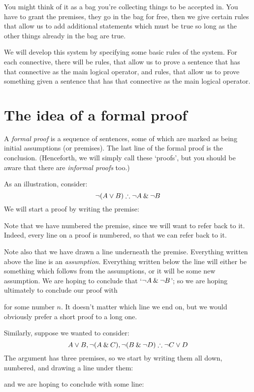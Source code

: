You might think of it as a bag you're collecting things to be accepted in. You have to grant the premises, they go in the bag for free, then we give certain rules that allow us to add additional statements which must be true so long as the other things already in the bag are true. 

We will develop this  system by specifying some basic rules of the system. For each connective, there will be  rules, that allow us to prove a sentence that has that connective as the main logical operator, and  rules, that allow us to prove something given a sentence that has that connective as the main logical operator.



\section{The idea of a formal proof}
A \emph{formal proof} is a sequence of sentences, some of which are marked as being initial assumptions (or premises). The last line of the formal proof is the conclusion. (Henceforth, we will simply call these `proofs', but you should be aware that there are \emph{informal proofs} too.)

As an illustration, consider:
	$$\enot (A \eor B) \therefore \enot A \eand \enot B$$
We will start a proof by writing the premise:
\begin{pf}
\end{pf}
Note that we have numbered the premise, since we will want to refer back to it. Indeed, every line on a proof is numbered, so that we can refer back to it. 

Note also that we have drawn a line underneath the premise. Everything written above the line is an \emph{assumption}. Everything written below the line will either be something which follows from the assumptions, or it will be some new assumption. We are hoping to conclude that `$\neg A \mathbin{\&} \neg B$'; so we are hoping ultimately to conclude our proof with
\begin{pf}
\end{pf}
for some number $n$. It doesn't matter which line we end on, but we would obviously prefer a short proof to a long one.

Similarly, suppose we wanted to consider:
$$A\eor B, \enot (A\eand C), \enot (B \eand \enot D) \therefore \enot C\eor D$$
The argument has three premises, so we start by writing them all down, numbered, and drawing a line under them:
\begin{pf}
\end{pf}
and we are hoping to conclude with some line:
\begin{pf}
\end{pf}

